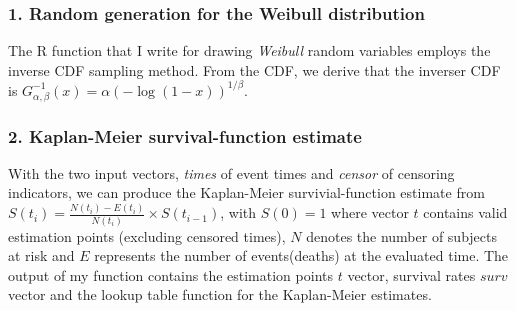 \documentclass{article}
\begin{document}
\subsubsection*{1. Random generation for the Weibull distribution}
\hspace{12 pt} The R function that I write for drawing
\textit{Weibull} random variables employs the inverse CDF sampling
method. From the CDF, we derive that the inverser CDF is 
$G^{-1}_{\alpha , \beta}(x) = \alpha(-\log(1-x))^{1/\beta}$.


\subsubsection*{2. Kaplan-Meier survival-function estimate}
\hspace{12 pt} With the two input vectors, \textit{times} of event
times and \textit{censor} of censoring indicators, we can produce the
Kaplan-Meier survivial-function estimate from \newline
$\displaystyle S(t_i) = \frac{N(t_i)-E(t_i)}{N(t_i)} \times S(t_{i-1})$, 
with $S(0) = 1$ \newline
where vector $t$ contains valid estimation points (excluding censored
times), $N$ denotes the number of subjects at risk and $E$ represents
the number of events(deaths) at the evaluated time. The output of my
function contains the estimation points $t$ vector, survival rates
$surv$ vector and the lookup table function for the Kaplan-Meier estimates.


\end{document}
